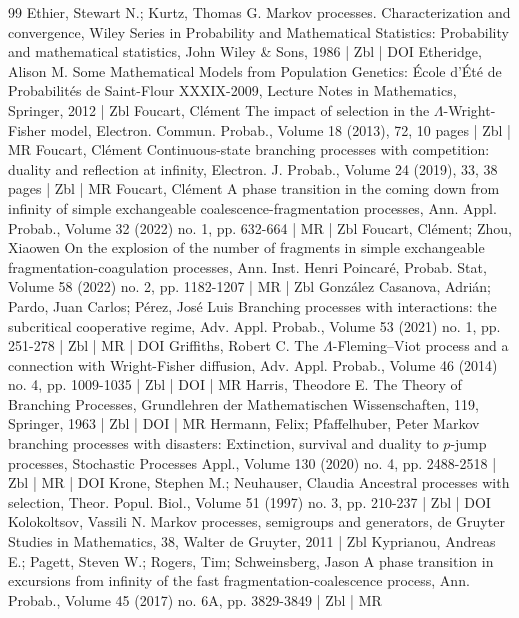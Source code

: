 \documentclass[10pt]{amsart}
\theoremstyle{definition}\newtheorem{defi}[theo]{Definition}\newtheorem{rema}[theo]{Remark}\newtheorem{exam}[theo]{Example}\newtheorem{exem}[theo]{Example}\newtheorem{nota}[theo]{Notation}
\begin{document}
\begin{thebibliography}{99}
 Ethier, Stewart N.; Kurtz, Thomas G. Markov processes. Characterization and convergence, Wiley Series in Probability and Mathematical Statistics: Probability and mathematical statistics, John Wiley \& Sons, 1986 | Zbl | DOI
 Etheridge, Alison M. Some Mathematical Models from Population Genetics: École d’Été de Probabilités de Saint-Flour XXXIX-2009, Lecture Notes in Mathematics, Springer, 2012 | Zbl
 Foucart, Clément The impact of selection in the $\Lambda $-Wright-Fisher model, Electron. Commun. Probab., Volume 18 (2013), 72, 10 pages | Zbl | MR
 Foucart, Clément Continuous-state branching processes with competition: duality and reflection at infinity, Electron. J. Probab., Volume 24 (2019), 33, 38 pages | Zbl | MR
 Foucart, Clément A phase transition in the coming down from infinity of simple exchangeable coalescence-fragmentation processes, Ann. Appl. Probab., Volume 32 (2022) no. 1, pp. 632-664 | MR | Zbl
 Foucart, Clément; Zhou, Xiaowen On the explosion of the number of fragments in simple exchangeable fragmentation-coagulation processes, Ann. Inst. Henri Poincaré, Probab. Stat, Volume 58 (2022) no. 2, pp. 1182-1207 | MR | Zbl
 González Casanova, Adrián; Pardo, Juan Carlos; Pérez, José Luis Branching processes with interactions: the subcritical cooperative regime, Adv. Appl. Probab., Volume 53 (2021) no. 1, pp. 251-278 | Zbl | MR | DOI
 Griffiths, Robert C. The $\Lambda $-Fleming–Viot process and a connection with Wright-Fisher diffusion, Adv. Appl. Probab., Volume 46 (2014) no. 4, pp. 1009-1035 | Zbl | DOI | MR
 Harris, Theodore E. The Theory of Branching Processes, Grundlehren der Mathematischen Wissenschaften, 119, Springer, 1963 | Zbl | DOI | MR
 Hermann, Felix; Pfaffelhuber, Peter Markov branching processes with disasters: Extinction, survival and duality to $p$-jump processes, Stochastic Processes Appl., Volume 130 (2020) no. 4, pp. 2488-2518 | Zbl | MR | DOI
 Krone, Stephen M.; Neuhauser, Claudia Ancestral processes with selection, Theor. Popul. Biol., Volume 51 (1997) no. 3, pp. 210-237 | Zbl | DOI
 Kolokoltsov, Vassili N. Markov processes, semigroups and generators, de Gruyter Studies in Mathematics, 38, Walter de Gruyter, 2011 | Zbl
 Kyprianou, Andreas E.; Pagett, Steven W.; Rogers, Tim; Schweinsberg, Jason A phase transition in excursions from infinity of the fast fragmentation-coalescence process, Ann. Probab., Volume 45 (2017) no. 6A, pp. 3829-3849 | Zbl | MR

\end{thebibliography}
\end{document}
